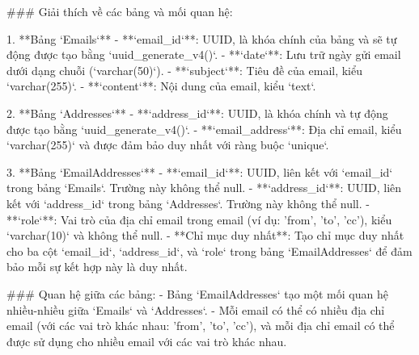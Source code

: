 ### Giải thích về các bảng và mối quan hệ:

1. **Bảng `Emails`**
   - **`email_id`**: UUID, là khóa chính của bảng và sẽ tự động được tạo bằng `uuid_generate_v4()`.
   - **`date`**: Lưu trữ ngày gửi email dưới dạng chuỗi (`varchar(50)`).
   - **`subject`**: Tiêu đề của email, kiểu `varchar(255)`.
   - **`content`**: Nội dung của email, kiểu `text`.

2. **Bảng `Addresses`**
   - **`address_id`**: UUID, là khóa chính và tự động được tạo bằng `uuid_generate_v4()`.
   - **`email_address`**: Địa chỉ email, kiểu `varchar(255)` và được đảm bảo duy nhất với ràng buộc `unique`.

3. **Bảng `EmailAddresses`**
   - **`email_id`**: UUID, liên kết với `email_id` trong bảng `Emails`. Trường này không thể null.
   - **`address_id`**: UUID, liên kết với `address_id` trong bảng `Addresses`. Trường này không thể null.
   - **`role`**: Vai trò của địa chỉ email trong email (ví dụ: 'from', 'to', 'cc'), kiểu `varchar(10)` và không thể null.
   - **Chỉ mục duy nhất**: Tạo chỉ mục duy nhất cho ba cột `email_id`, `address_id`, và `role` trong bảng `EmailAddresses` để đảm bảo mỗi sự kết hợp này là duy nhất.

### Quan hệ giữa các bảng:
- Bảng `EmailAddresses` tạo một mối quan hệ nhiều-nhiều giữa `Emails` và `Addresses`.
- Mỗi email có thể có nhiều địa chỉ email (với các vai trò khác nhau: 'from', 'to', 'cc'), và mỗi địa chỉ email có thể được sử dụng cho nhiều email với các vai trò khác nhau.